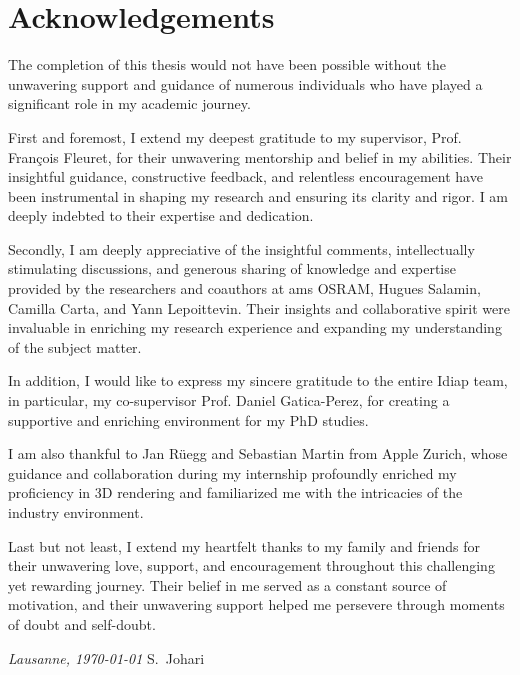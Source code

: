 \chapter*{Acknowledgements}
The completion of this thesis would not have been possible without the unwavering support and guidance of numerous individuals who have played a significant role in my academic journey.

\vspace{2ex}
First and foremost, I extend my deepest gratitude to my supervisor, Prof. François Fleuret, for their unwavering mentorship and belief in my abilities. Their insightful guidance, constructive feedback, and relentless encouragement have been instrumental in shaping my research and ensuring its clarity and rigor. I am deeply indebted to their expertise and dedication.

\vspace{2ex}
Secondly, I am deeply appreciative of the insightful comments, intellectually stimulating discussions, and generous sharing of knowledge and expertise provided by the researchers and coauthors at ams OSRAM, Hugues Salamin, Camilla Carta, and Yann Lepoittevin. Their insights and collaborative spirit were invaluable in enriching my research experience and expanding my understanding of the subject matter.

\vspace{2ex}
In addition, I would like to express my sincere gratitude to the entire Idiap team, in particular, my co-supervisor Prof. Daniel Gatica-Perez, for creating a supportive and enriching environment for my PhD studies.

\vspace{2ex}
I am also thankful to Jan Rüegg and Sebastian Martin from Apple Zurich, whose guidance and collaboration during my internship profoundly enriched my proficiency in 3D rendering and familiarized me with the intricacies of the industry environment.

\vspace{2ex}
Last but not least, I extend my heartfelt thanks to my family and friends for their unwavering love, support, and encouragement throughout this challenging yet rewarding journey. Their belief in me served as a constant source of motivation, and their unwavering support helped me persevere through moments of doubt and self-doubt.

\bigskip
 
\noindent\textit{Lausanne, \today}
\hfill S.~Johari
